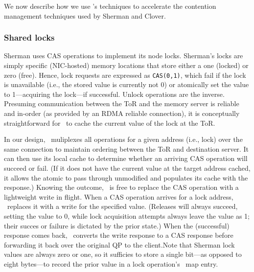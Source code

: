 We now describe how we use \sword's techniques to accelerate the
contention management techniques used by Sherman and Clover.

\subsubsection{Shared locks}
\label{sec:locking-algorithm}

Sherman uses CAS operations to implement its node locks.
%
Sherman's locks are simply specific (NIC-hosted) memory locations that
store either a one (locked) or zero (free).  Hence, lock requests are
expressed as \texttt{CAS(0,1)}, which fail if the lock is unavailable
(i.e., the stored value is currently not 0) or atomically set the
value to 1---acquiring the lock---if successful. Unlock operations are
the inverse.  Presuming communication between the ToR and the memory
server is reliable and in-order (as provided by an RDMA reliable
connection), it is conceptually straightforward for \sword\ to cache
the current value of the lock at the ToR.

In our design, \sword\ muliplexes all operations for a given address
(i.e., lock) over the same connection to maintain ordering between the
ToR and destination server.  It can then use its local cache to
determine whether an arriving CAS operation will succeed or fail.  (If
it does not have the current value at the target address cached, it
allows the atomic to pass through unmodified and populates its cache
with the response.)  Knowing the outcome, \sword\ is free to replace
the CAS operation with a lightweight write in flight.  When a CAS
operation arrives for a lock address, \sword\ replaces it with a write
for the specified value.  (Releases will always succeed, setting the
value to 0, while lock acquisition attempts always leave the value as
1; their succes or failure is dictated by the prior state.)  When the
(successful) response comes back, \sword\ converts the write response
to a CAS response before forwarding it back over the original QP to
the client.Note that Sherman lock values are always zero or one, so it
sufficies to store a single bit---as opposed to eight bytes---to
record the prior value in a lock operation's \sword\ map entry.

